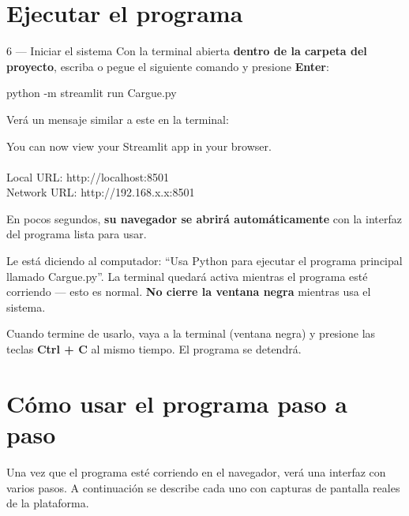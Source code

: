 \documentclass[12pt, letterpaper]{article}
\begin{document}
\section{Ejecutar el programa}

\begin{paso}{6 — Iniciar el sistema}
  Con la terminal abierta \textbf{dentro de la carpeta del proyecto}, escriba o pegue el siguiente comando y presione \textbf{Enter}:
  \begin{comando}
    python -m streamlit run Cargue.py
  \end{comando}
  \vspace{0.3em}
  Verá un mensaje similar a este en la terminal:
  \begin{comando}
    You can now view your Streamlit app in your browser.\\
    \\
    \quad Local URL:  http://localhost:8501\\
    \quad Network URL: http://192.168.x.x:8501
  \end{comando}
  \vspace{0.3em}
  En pocos segundos, \textbf{su navegador se abrirá automáticamente} con la interfaz del programa lista para usar.
\end{paso}

\begin{info}
  Le está diciendo al computador: ``Usa Python para ejecutar el programa principal llamado Cargue.py''. La terminal quedará activa mientras el programa esté corriendo — esto es normal. \textbf{No cierre la ventana negra} mientras usa el sistema.
\end{info}

\begin{aviso}
  Cuando termine de usarlo, vaya a la terminal (ventana negra) y presione las teclas \textbf{Ctrl + C} al mismo tiempo. El programa se detendrá.
\end{aviso}

\section{Cómo usar el programa paso a paso}

Una vez que el programa esté corriendo en el navegador, verá una interfaz con varios pasos. A continuación se describe cada uno con capturas de pantalla reales de la plataforma.
\end{document}

